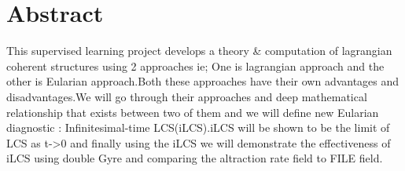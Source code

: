 \documentclass[../report.tex]{subfiles}
\begin{document}
\chapter{Abstract}
This supervised learning project develops a theory \& computation of lagrangian coherent structures using 2 approaches ie; One is lagrangian approach and the other is Eularian approach.Both these approaches have their own advantages and disadvantages.We will go through their approaches and deep mathematical relationship that exists between two of them and we will define new Eularian diagnostic : Infinitesimal-time LCS(iLCS).iLCS will be shown to be the limit of LCS as t->0 and finally using the iLCS we will demonstrate the effectiveness of iLCS using double Gyre and comparing the altraction rate field to FILE field.
\end{document}
